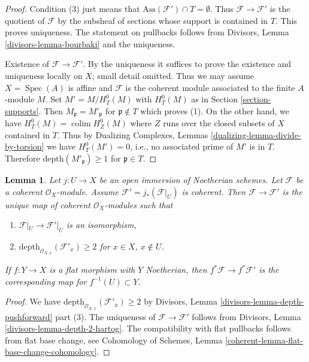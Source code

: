 \documentclass{stacks-project}
\theoremstyle{plain}
\newtheorem{lemma}[subsection]{Lemma}
\theoremstyle{definition}
\theoremstyle{remark}
\numberwithin{equation}{subsection}
\def\colim{\mathop{\mathrm{colim}}\nolimits}
\def\Spec{\mathop{\mathrm{Spec}}}
\begin{document}
\begin{proof}
Condition (3) just means that $\text{Ass}(\mathcal{F}') \cap T = \emptyset$.
Thus $\mathcal{F} \to \mathcal{F}'$ is the quotient of $\mathcal{F}$
by the subsheaf of sections whose support is contained in $T$.
This proves uniqueness. The statement on pullbacks follows from
Divisors, Lemma \ref{divisors-lemma-bourbaki}
and the uniqueness.

\medskip\noindent
Existence of $\mathcal{F} \to \mathcal{F}'$.
By the uniqueness it suffices to prove the
existence and uniqueness locally on $X$; small detail omitted.
Thus we may assume $X = \Spec(A)$ is affine and $\mathcal{F}$
is the coherent module associated to the finite $A$-module $M$.
Set $M' = M / H^0_T(M)$ with $H^0_T(M)$ as in Section \ref{section-supports}.
Then $M_\mathfrak p = M'_\mathfrak p$ for $\mathfrak p \not \in T$
which proves (1). On the other hand, we have
$H^0_T(M) = \colim H^0_Z(M)$ where $Z$ runs over the closed
subsets of $X$ contained in $T$. Thus by
Dualizing Complexes, Lemmas \ref{dualizing-lemma-divide-by-torsion}
we have $H^0_T(M') = 0$, i.e., no associated prime
of $M'$ is in $T$. Therefore $\text{depth}(M'_\mathfrak p) \geq 1$
for $\mathfrak p \in T$.
\end{proof}

\begin{lemma}
\label{lemma-get-depth-2-along-Z}
Let $j : U \to X$ be an open immersion of Noetherian schemes.
Let $\mathcal{F}$ be a coherent $\mathcal{O}_X$-module.
Assume $\mathcal{F}' = j_*(\mathcal{F}|_U)$ is coherent.
Then $\mathcal{F} \to \mathcal{F}'$ is the unique map
of coherent $\mathcal{O}_X$-modules such that
\begin{enumerate}
\item $\mathcal{F}|_U \to \mathcal{F}'|_U$
is an isomorphism,
\item $\text{depth}_{\mathcal{O}_{X, x}}(\mathcal{F}'_x) \geq 2$
for $x \in X$, $x \not \in U$.
\end{enumerate}
If $f : Y \to X$ is a flat morphism with $Y$ Noetherian, then
$f^*\mathcal{F} \to f^*\mathcal{F}'$ is the corresponding
map for $f^{-1}(U) \subset Y$.
\end{lemma}

\begin{proof}
We have $\text{depth}_{\mathcal{O}_{X, x}}(\mathcal{F}'_x) \geq 2$
by Divisors, Lemma \ref{divisors-lemma-depth-pushforward} part (3).
The uniqueness of $\mathcal{F} \to \mathcal{F}'$ follows from
Divisors, Lemma \ref{divisors-lemma-depth-2-hartog}.
The compatibility with flat pullbacks follows from
flat base change, see Cohomology of Schemes, Lemma
\ref{coherent-lemma-flat-base-change-cohomology}.
\end{proof}
\end{document}
